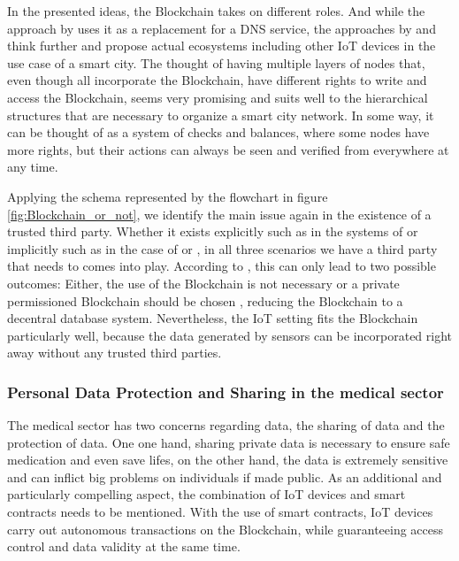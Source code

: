 In the presented ideas, the Blockchain takes on different roles. And while the approach by \cite{Rowan2017} uses it as a replacement for a DNS service, the approaches by \cite{DorriSteger2017} and \cite{Sharma2017} think further and propose actual ecosystems including other IoT devices in the use case of a smart city.
The thought of having multiple layers of nodes that, even though all incorporate the Blockchain, have different rights to write and access the Blockchain, seems very promising and suits well to the hierarchical structures that are necessary to organize a smart city network. In some way, it can be thought of as a system of checks and balances, where some nodes have more rights, but their actions can always be seen and verified from everywhere at any time.

Applying the schema represented by the flowchart in figure \ref{fig:Blockchain_or_not}, we identify the main issue again in the existence of a trusted third party. Whether it exists explicitly such as in the systems of \cite{Sharma2017} or implicitly such as in the case of \cite{Rowan2017} or \cite{DorriSteger2017}, in all three scenarios we have a third party that needs to comes into play. 
According to \cite{Wust2017}, this can only lead to two possible outcomes: Either, the use of the Blockchain is not necessary or a private permissioned Blockchain should be chosen \cite{Wust2017}, reducing the Blockchain to a decentral database system.
Nevertheless, the IoT setting fits the Blockchain particularly well, because the data generated by sensors can be incorporated right away without any trusted third parties.

\subsubsection{Personal Data Protection and Sharing in the medical sector}
The medical sector has two concerns regarding data, the sharing of data and the protection of data. One one hand, sharing private data is necessary to ensure safe medication and even save lifes, on the other hand, the data is extremely sensitive and can inflict big problems on individuals if made public.
As an additional and particularly compelling aspect, the combination of IoT devices and smart contracts needs to be mentioned. With the use of smart contracts, IoT devices carry out autonomous transactions on the Blockchain, while guaranteeing access control and data validity at the same time.

